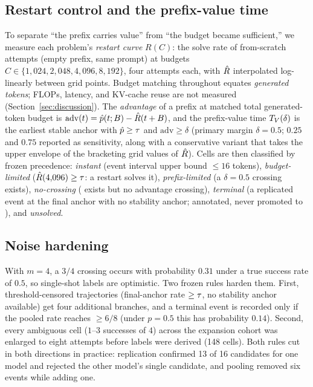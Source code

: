 \subsection{Restart control and the prefix-value time \Tv}

To separate ``the prefix carries value'' from ``the budget became
sufficient,'' we measure each problem's \emph{restart curve} $R(C)$: the
solve rate of from-scratch attempts (empty prefix, same prompt) at budgets
$C \in \{1{,}024, 2{,}048, 4{,}096, 8{,}192\}$, four attempts each, with
$\hat{R}$ interpolated log-linearly between grid points. Budget matching
throughout equates \emph{generated tokens}; FLOPs, latency, and KV-cache
reuse are not measured (Section~\ref{sec:discussion}). The
\emph{advantage} of a prefix at matched total generated-token budget is
$\mathrm{adv}(t) = \hat{p}(t; B) - \hat{R}(t + B)$, and the prefix-value time
$T_V(\delta)$ is the earliest stable anchor with $\hat{p} \ge \tau$ and
$\mathrm{adv} \ge \delta$ (primary margin $\delta = 0.5$; $0.25$ and
$0.75$ reported as sensitivity, along with a conservative variant that
takes the upper envelope of the bracketing grid values of $\hat{R}$). Cells
are then classified by frozen precedence: \emph{instant} (event interval
upper bound $\le 16$ tokens), \emph{budget-limited} ($\hat{R}(4{,}096) \ge
\tau$: a restart solves it), \emph{prefix-limited} (a $\delta = 0.5$
crossing exists), \emph{no-crossing} (\Tf{} exists but no advantage
crossing), \emph{terminal} (a replicated event at the final anchor with no
stability anchor; annotated, never promoted to \Tv), and \emph{unsolved}.

\subsection{Noise hardening}

With $m = 4$, a $3/4$ crossing occurs with probability $0.31$ under a true
success rate of $0.5$, so single-shot labels are optimistic. Two frozen
rules harden them. First, threshold-censored trajectories (final-anchor
rate $\ge \tau$, no stability anchor available) get four additional
branches, and a terminal event is recorded only if the pooled rate reaches
$\ge 6/8$ (under $p = 0.5$ this has probability $0.14$). Second, every
ambiguous cell ($1$--$3$ successes of $4$) across the expansion cohort was
enlarged to eight attempts before labels were derived (148 cells). Both
rules cut in both directions in practice: replication confirmed 13 of 16
candidates for one model and rejected the other model's single candidate,
and pooling removed six events while adding one.

